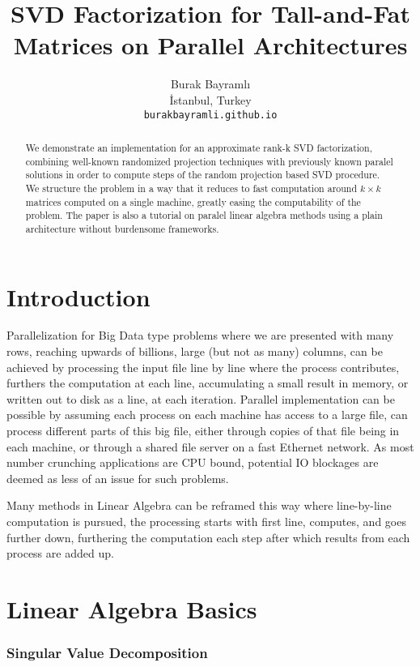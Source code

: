 \documentclass{article}
\title{SVD Factorization for Tall-and-Fat Matrices on Parallel Architectures}
\author{
  Burak Bayramlı \\
  İstanbul, Turkey\\
  \texttt{burakbayramli.github.io} 
}
\begin{document}
\maketitle

\begin{abstract}
We demonstrate an implementation for an approximate rank-k SVD factorization,
combining well-known randomized projection techniques with previously known
paralel solutions in order to compute steps of the random projection based SVD
procedure. We structure the problem in a way that it reduces to fast computation
around $k \times k$ matrices computed on a single machine, greatly easing the
computability of the problem. The paper is also a tutorial on paralel linear
algebra methods using a plain architecture without burdensome frameworks.
\end{abstract}



\section{Introduction}

Parallelization for Big Data type problems where we are presented with many
rows, reaching upwards of billions, large (but not as many) columns, can be
achieved by processing the input file line by line where the process
contributes, furthers the computation at each line, accumulating a small result
in memory, or written out to disk as a line, at each iteration. Parallel
implementation can be possible by assuming each process on each machine has
access to a large file, can process different parts of this big file, either
through copies of that file being in each machine, or through a shared file
server on a fast Ethernet network. As most number crunching applications are CPU
bound, potential IO blockages are deemed as less of an issue for such problems.

Many methods in Linear Algebra can be reframed this way where line-by-line
computation is pursued, the processing starts with first line, computes, and
goes further down, furthering the computation each step after which results from
each process are added up.

\section{Linear Algebra Basics}

\subsubsection{Singular Value Decomposition}
\end{document}
